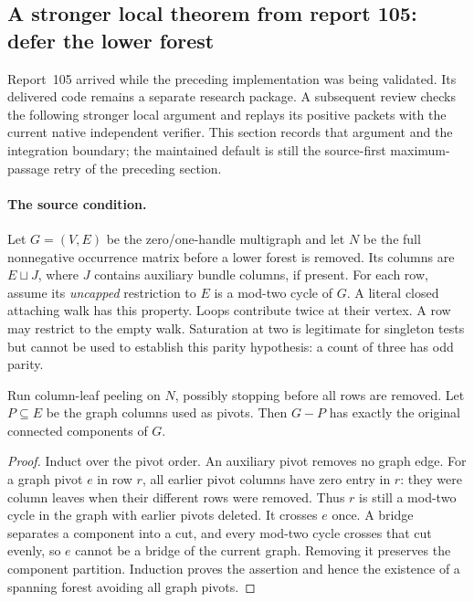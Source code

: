 \subsection{A stronger local theorem from report 105: defer the lower forest}
\label{marked-cut:deferred-review}

Report~105 arrived while the preceding implementation was being validated.
Its delivered code remains a separate research package. A subsequent review
checks the following stronger local argument and replays its positive
packets with the current native independent verifier. This section records
that argument and the integration boundary; the maintained default is still
the source-first maximum-passage retry of the preceding section.

\paragraph{The source condition.}
Let $G=(V,E)$ be the zero/one-handle multigraph and let $N$ be the full
nonnegative occurrence matrix before a lower forest is removed. Its columns
are $E\sqcup J$, where $J$ contains auxiliary bundle columns, if present.
For each row, assume its \emph{uncapped} restriction to $E$ is a mod-two
cycle of $G$. A literal closed attaching walk has this property. Loops
contribute twice at their vertex. A row may restrict to the empty walk.
Saturation at two is legitimate for singleton tests but cannot be used to
establish this parity hypothesis: a count of three has odd parity.

\begin{proposition}
Run column-leaf peeling on $N$, possibly stopping before all rows are
removed. Let $P\subseteq E$ be the graph columns used as pivots. Then
$G-P$ has exactly the original connected components of $G$.
\end{proposition}
\begin{proof}
Induct over the pivot order. An auxiliary pivot removes no graph edge.
For a graph pivot $e$ in row $r$, all earlier pivot columns have zero entry
in $r$: they were column leaves when their different rows were removed.
Thus $r$ is still a mod-two cycle in the graph with earlier pivots deleted.
It crosses $e$ once. A bridge separates a component into a cut, and every
mod-two cycle crosses that cut evenly, so $e$ cannot be a bridge of the
current graph. Removing it preserves the component partition. Induction
proves the assertion and hence the existence of a spanning forest avoiding
all graph pivots.
\end{proof}


